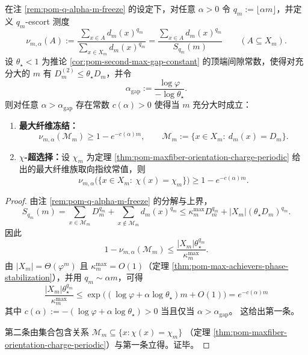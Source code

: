 \begin{corollary}[\texorpdfstring{$q=\alpha m$}{q=alpha m} 零温冻结与 \texorpdfstring{$\chi$}{chi}-超选择]\label{cor:pom-diagonal-freeze-chi-superselection}
在注 \ref{rem:pom-q-alpha-m-freeze} 的设定下，对任意 \(\alpha>0\) 令 \(q_m:=\lfloor \alpha m\rfloor\)，并定义 \(q_m\)-escort 测度
\[
\nu_{m,\alpha}(A):=\frac{\sum_{x\in A} d_m(x)^{q_m}}{\sum_{x\in X_m} d_m(x)^{q_m}}
=\frac{\sum_{x\in A} d_m(x)^{q_m}}{S_{q_m}(m)}\qquad(A\subseteq X_m).
\]
设 \(\theta_\star<1\) 为推论 \ref{cor:pom-second-max-gap-constant} 的顶端间隙常数，使得对充分大的 \(m\) 有 \(D_m^{(2)}\le \theta_\star D_m\)，并令
\[
\alpha_{\mathrm{gap}}:=\frac{\log\varphi}{-\log\theta_\star}.
\]
则对任意 \(\alpha>\alpha_{\mathrm{gap}}\) 存在常数 \(c(\alpha)>0\) 使得当 \(m\) 充分大时成立：
\begin{enumerate}
\normalfont
  \item \textbf{最大纤维冻结：}
  \[
  \nu_{m,\alpha}(\mathcal{M}_m)\ge 1-e^{-c(\alpha)m},
  \qquad
  \mathcal{M}_m:=\{x\in X_m:\ d_m(x)=D_m\}.
  \]
  \item \textbf{\(\chi\)-超选择：}设 \(\chi_m\) 为定理 \ref{thm:pom-maxfiber-orientation-charge-periodic} 给出的最大纤维族取向指纹常值，则
  \[
  \nu_{m,\alpha}\bigl(\{x\in X_m:\ \chi(x)=\chi_m\}\bigr)\ge 1-e^{-c(\alpha)m}.
  \]
\end{enumerate}
\end{corollary}
\begin{proof}
由注 \ref{rem:pom-q-alpha-m-freeze} 的分解与上界，
\[
S_{q_m}(m)=\sum_{x\in\mathcal{M}_m}D_m^{q_m}+\sum_{x\notin\mathcal{M}_m}d_m(x)^{q_m}
\le \kappa_m^{\mathrm{max}}D_m^{q_m}+|X_m|(\theta_\star D_m)^{q_m}.
\]
因此
\[
1-\nu_{m,\alpha}(\mathcal{M}_m)
\le
\frac{|X_m|\theta_\star^{q_m}}{\kappa_m^{\mathrm{max}}}.
\]
由 \(|X_m|=\Theta(\varphi^m)\) 且 \(\kappa_m^{\mathrm{max}}=O(1)\)（定理 \ref{thm:pom-max-achievers-phase-stabilization}），并用 \(q_m\sim \alpha m\)，可得
\[
\frac{|X_m|\theta_\star^{q_m}}{\kappa_m^{\mathrm{max}}}
\le
\exp\!\bigl((\log\varphi+\alpha\log\theta_\star)m+O(1)\bigr)
=e^{-c(\alpha)m}
\]
其中 \(c(\alpha):=-(\log\varphi+\alpha\log\theta_\star)>0\) 当且仅当 \(\alpha>\alpha_{\mathrm{gap}}\)。
这给出第一条。
\par
第二条由集合包含关系
\(
\mathcal{M}_m\subseteq \{x:\chi(x)=\chi_m\}
\)
（定理 \ref{thm:pom-maxfiber-orientation-charge-periodic}）与第一条立得。证毕。
\end{proof}

